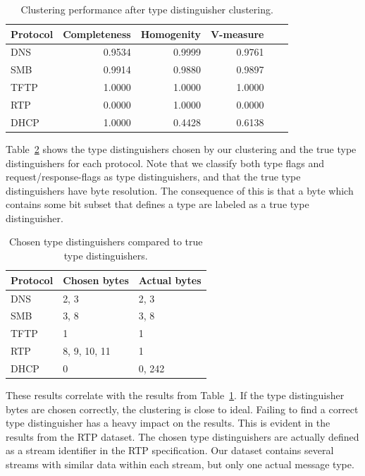 \documentclass[a4paper]{report}
\begin{document}
\begin{table}[h]
    \centering
    \captionsetup{width=0.8\textwidth}
    \caption{Clustering performance after type distinguisher clustering.}
    \begin{tabular}{| l | r | r | r | r | r |}
        \hline
        \textbf{Protocol}&\textbf{Completeness}&\textbf{Homogenity}&\textbf{V-measure} \\ \hline
        DNS & 0.9534 & 0.9999 & 0.9761 \\ \hline
        SMB & 0.9914 & 0.9880 & 0.9897 \\ \hline
        TFTP & 1.0000 & 1.0000 & 1.0000 \\ \hline
        RTP & 0.0000 & 1.0000 & 0.0000 \\ \hline
        DHCP & 1.0000 & 0.4428 & 0.6138 \\ \hline
    \end{tabular}
    \label{tab:tdclusterresults}
\end{table}

Table~\ref{tab:typedistinguishers} shows the type distinguishers chosen
by our clustering and the true type distinguishers for each protocol. Note that
we classify both type flags and request/response-flags as type distinguishers,
and that the true type distinguishers have byte resolution. The consequence of
this is that a byte which contains some bit subset that defines a type are
labeled as a true type distinguisher.

\begin{table}[h]
    \centering
    \captionsetup{width=0.8\textwidth}
    \caption{Chosen type distinguishers compared to true type distinguishers.}
    \begin{tabular}{| l | l | l |}
        \hline
        \textbf{Protocol}&\textbf{Chosen bytes}&\textbf{Actual bytes}\\ \hline
        DNS  & 2, 3         & 2, 3  \\ \hline
        SMB  & 3, 8         & 3, 8  \\ \hline
        TFTP & 1            & 1     \\ \hline
        RTP  & 8, 9, 10, 11 & 1     \\ \hline
        DHCP & 0            & 0, 242\\ \hline
    \end{tabular}
    \label{tab:typedistinguishers}
\end{table}

These results correlate with the results from Table~\ref{tab:tdclusterresults}.
If the type distinguisher bytes are chosen correctly, the clustering is close
to ideal. Failing to find a correct type distinguisher has a heavy impact on
the results. This is evident in the results from the RTP dataset. The chosen
type distinguishers are actually defined as a stream identifier in the RTP
specification. Our dataset contains several streams with similar data within
each stream, but only one actual message type.
\end{document}
